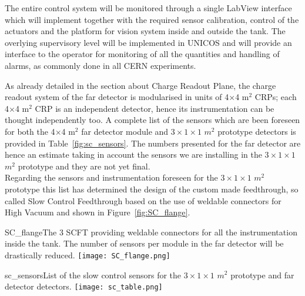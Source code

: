  The entire control system will be monitored through a single LabView  interface which will implement together with the required sensor
 calibration, control of the actuators and the platform for vision  system inside and outside the tank. The overlying supervisory level
 will be implemented in UNICOS and will provide an interface to the  operator for monitoring of all the quantities and handling of alarms,
 as commonly done in all CERN experiments.  

As already detailed in the section about Charge Readout Plane, the charge readout system of the far detector is modularised in units of 4$\times$4 m$^2$ CRPs; each 4$\times$4 m$^2$ CRP is an independent detector, hence its instrumentation can be thought independently too. A complete list of the sensors which are been foreseen for both the 4$\times$4 m$^2$ far detector module and $3 \times 1 \times 1$ $m^2$ prototype detectors is provided in Table~\ref{fig:sc_sensors}.  The numbers presented for the far detector are hence an estimate taking in account the sensors we are installing in the $3 \times 1 \times 1$ $m^2$ prototype and they are not yet final.
\\ Regarding the sensors and instrumentation foreseen for the $3 \times 1 \times 1$ $m^2$ prototype this list has determined the design of the custom made feedthrough, so called Slow Control Feedthrough based on the use of weldable connectors for High Vacuum and shown in Figure~\ref{fig:SC_flange}.

\begin{cdrfigure}{SC_flange}{The 3 SCFT providing weldable connectors for all the instrumentation inside the tank. The number of sensors per module in the far detector will be drastically reduced.}
   \texttt{[image: SC\_flange.png]}
 \end{cdrfigure}

\begin{cdrfigure}{sc_sensors}{List of the slow control sensors for the $3 \times 1 \times 1$ $m^2$ prototype and far detector detectors.}
 \texttt{[image: sc\_table.png]}
 \end{cdrfigure}
   